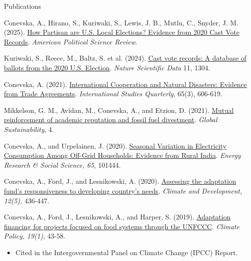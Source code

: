 \documentclass{resume}
\begin{document}
\begin{rSection}{\Large  P\MakeLowercase{ublications}} \itemsep -3pt {}
\vspace{-0.7cm}

\item Conevska, A., Hirano, S., Kuriwaki, S., Lewis, J. B., Mutlu, C., Snyder, J. M. (2025). \href{https://doi.org/10.1017/S0003055425100920}{How Partisan are U.S. Local Elections? Evidence from 2020 Cast Vote Records}. \textit{American Political Science Review}.
\medskip

\item Kuriwaki, S., Reece, M., Baltz, S. et al. (2024). \href{https://doi.org/10.1038/s41597-024-04017-1}{Cast vote records: A database of ballots from the 2020 U.S. Election}. \textit{Nature Scientific Data} 11, 1304.
\medskip

\item Conevska, A. (2021). \href{https://doi.org/10.1093/isq/sqab065}{International Cooperation and Natural Disasters: Evidence from Trade Agreements}. \textit{International Studies Quarterly},  65(3), 606-619.
\medskip

\item Mikkelson, G. M., Avidan, M., Conevska, A., and Etzion, D. (2021). \href{https://doi.org/10.1017/sus.2021.19}{Mutual reinforcement of academic reputation and fossil fuel divestment}. \textit{Global Sustainability}, 4.
\medskip

\item Conevska, A., and Urpelainen, J. (2020). \href{https://doi.org/10.1016/j.erss.2020.101444}{Seasonal Variation in Electricity Consumption Among Off-Grid Households: Evidence from Rural India}. \textit{ Energy Research \& Social Science, 65}, 101444. 
\medskip

\item Conevska, A., Ford, J., and Lesnikowski, A. (2020). \href{https://doi.org/10.1080/17565529.2019.1638225}{Assessing the adaptation fund’s responsiveness to developing country’s needs}. \textit{Climate and Development, 12(5),} 436-447. 
\medskip

\item Conevska, A., Ford, J., Lesnikowski, A., and Harper, S. (2019). \href{https://doi.org/10.1080/14693062.2018.1466682}{Adaptation financing for projects focused on food systems through the UNFCCC}. \textit{Climate Policy, 19(1)}, 43-58. 
\begin{itemize}
    \item Cited in the Intergovernmental Panel on Climate Change (IPCC) Report.
\end{itemize}



\end{rSection}
\end{document}
